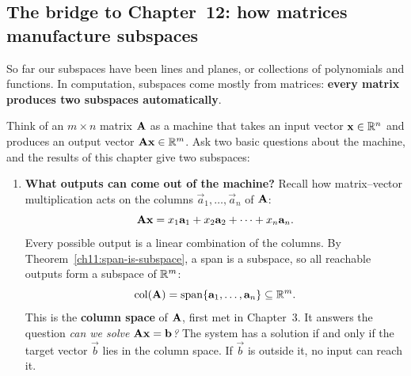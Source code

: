 \subsection{The bridge to Chapter~12: how matrices manufacture subspaces}

So far our subspaces have been lines and planes, or collections of polynomials and
functions. In computation, subspaces come mostly from matrices:
\textbf{every matrix produces two subspaces automatically}.

Think of an $m\times n$ matrix $\mathbf{A}$ as a machine that takes an input vector
$\mathbf{x}\in\mathbb{R}^n$ and produces an output vector $\mathbf{A}\mathbf{x}\in\mathbb{R}^m$. Ask two basic
questions about the machine, and the results of this chapter give two subspaces:

\begin{enumerate}
  \item \textbf{What outputs can come out of the machine?}
  Recall how matrix--vector multiplication acts on the columns $\vec{a}_1,\dots,\vec{a}_n$
  of $\mathbf{A}$:
  \[
  \mathbf{A}\mathbf{x} = x_1\mathbf{a}_1 + x_2\mathbf{a}_2 + \cdots + x_n\mathbf{a}_n.
  \]
  Every possible output is a linear combination of the columns. By
  Theorem~\ref{ch11:span-is-subspace}, a span is a subspace, so all reachable outputs
  form a subspace of $\mathbb{R}^m$:
  \[
  \operatorname{col}(\mathbf{A}) = \operatorname{span}\{\mathbf{a}_1,\dots,\mathbf{a}_n\} \subseteq \mathbb{R}^m.
  \]
  This is the \textbf{column space} of $\mathbf{A}$, first met in Chapter~3. It answers the
  question \emph{can we solve $\mathbf{A}\mathbf{x}=\mathbf{b}$?} The system has a solution if and
  only if the target vector $\vec{b}$ lies in the column space. If $\vec{b}$ is outside
  it, no input can reach it.


\end{enumerate}
